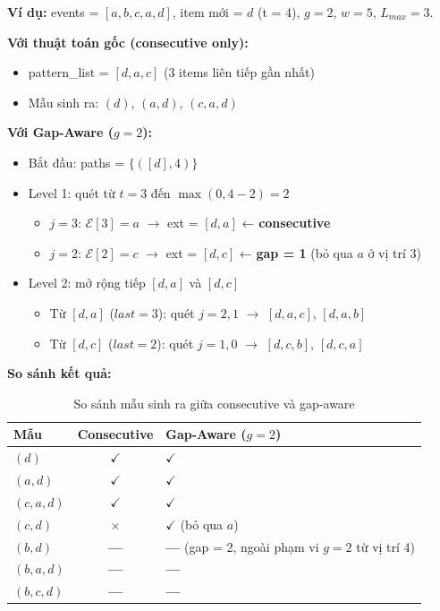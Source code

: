 \documentclass[a4paper,12pt]{report}
\begin{document}
\textbf{Ví dụ:} events = $[a, b, c, a, d]$, item mới = $d$ (t = 4), $g = 2$, $w = 5$, $L_{max} = 3$.

\textbf{Với thuật toán gốc (consecutive only):}
\begin{itemize}
    \item pattern\_list = $[d, a, c]$ (3 items liên tiếp gần nhất)
    \item Mẫu sinh ra: $(d)$, $(a, d)$, $(c, a, d)$
\end{itemize}

\textbf{Với Gap-Aware ($g = 2$):}
\begin{itemize}
    \item Bắt đầu: paths = $\{([d], 4)\}$
    \item Level 1: quét từ $t=3$ đến $\max(0, 4-2) = 2$
    \begin{itemize}
        \item $j = 3$: $\mathcal{E}[3] = a$ $\rightarrow$ ext = $[d, a]$ ← \textbf{consecutive}
        \item $j = 2$: $\mathcal{E}[2] = c$ $\rightarrow$ ext = $[d, c]$ ← \textbf{gap = 1} (bỏ qua $a$ ở vị trí 3)
    \end{itemize}
    \item Level 2: mở rộng tiếp $[d, a]$ và $[d, c]$
    \begin{itemize}
        \item Từ $[d, a]$ ($\textit{last}=3$): quét $j=2,1$ $\rightarrow$ $[d, a, c]$, $[d, a, b]$
        \item Từ $[d, c]$ ($\textit{last}=2$): quét $j=1,0$ $\rightarrow$ $[d, c, b]$, $[d, c, a]$
    \end{itemize}
\end{itemize}

\textbf{So sánh kết quả:}
\begin{table}[H]
    \centering
    \caption{So sánh mẫu sinh ra giữa consecutive và gap-aware}
    \label{tab:gap_compare}
    \begin{tabular}{lcl}
        \toprule
        \textbf{Mẫu} & \textbf{Consecutive} & \textbf{Gap-Aware ($g=2$)} \\
        \midrule
        $(d)$       & $\checkmark$ & $\checkmark$ \\
        $(a, d)$    & $\checkmark$ & $\checkmark$ \\
        $(c, a, d)$ & $\checkmark$ & $\checkmark$ \\
        $(c, d)$    & $\times$ & $\checkmark$ (bỏ qua $a$) \\
        $(b, d)$    & \textbf{---} & \textbf{---} (gap = 2, ngoài phạm vi $g=2$ từ vị trí 4) \\
        $(b, a, d)$ & \textbf{---} & \textbf{---} \\
        $(b, c, d)$ & \textbf{---} & \textbf{---} \\
        \bottomrule
    \end{tabular}
\end{table}
\end{document}
